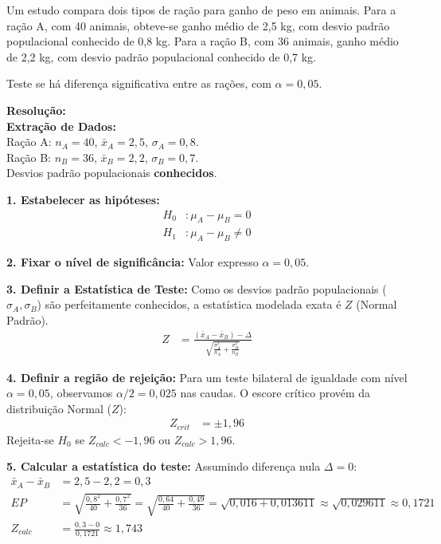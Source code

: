 \documentclass[12pt, a4paper]{article}
\begin{document}
Um estudo compara dois tipos de ração para ganho de peso em animais. Para a ração A, com 40 animais, obteve-se ganho médio de 2,5 kg, com desvio padrão populacional conhecido de 0,8 kg. Para a ração B, com 36 animais, ganho médio de 2,2 kg, com desvio padrão populacional conhecido de 0,7 kg. 

\medskip\noindent Teste se há diferença significativa entre as rações, com $\alpha = 0{,}05$.

\vspace{0.3cm}
\noindent\textbf{Resolução:}\\
\textbf{Extração de Dados:} \\
Ração A: $n_A = 40$, $\bar{x}_A = 2{,}5$, $\sigma_A = 0{,}8$. \\
Ração B: $n_B = 36$, $\bar{x}_B = 2{,}2$, $\sigma_B = 0{,}7$. \\
Desvios padrão populacionais \textbf{conhecidos}.

\medskip\noindent \textbf{1. Estabelecer as hipóteses:}
\begin{align*}
H_0 &: \mu_A - \mu_B = 0 \\
H_1 &: \mu_A - \mu_B \neq 0
\end{align*}

\noindent \textbf{2. Fixar o nível de significância:}
Valor expresso $\alpha = 0{,}05$.

\noindent \textbf{3. Definir a Estatística de Teste:}
Como os desvios padrão populacionais ($\sigma_A, \sigma_B$) são perfeitamente conhecidos, a estatística modelada exata é $Z$ (Normal Padrão).
\begin{align*}
Z &= \frac{(\bar{x}_A - \bar{x}_B) - \Delta}{\sqrt{\frac{\sigma_A^2}{n_A} + \frac{\sigma_B^2}{n_B}}}
\end{align*}

\noindent \textbf{4. Definir a região de rejeição:}
Para um teste bilateral de igualdade com nível $\alpha = 0{,}05$, observamos $\alpha/2 = 0{,}025$ nas caudas. O escore crítico provém da distribuição Normal ($Z$):
\begin{align*}
Z_{crit} &= \pm 1{,}96
\end{align*}
Rejeita-se $H_0$ se $Z_{calc} < -1{,}96$ ou $Z_{calc} > 1{,}96$.

\noindent \textbf{5. Calcular a estatística do teste:}
Assumindo diferença nula $\Delta = 0$:
\begin{align*}
\bar{x}_A - \bar{x}_B &= 2{,}5 - 2{,}2 = \boxed{0{,}3} \\
EP &= \sqrt{\frac{0{,}8^2}{40} + \frac{0{,}7^2}{36}} = \sqrt{\frac{0{,}64}{40} + \frac{0{,}49}{36}} = \sqrt{0{,}016 + 0{,}013611} \approx \sqrt{0{,}029611} \approx \boxed{0{,}1721} \\
Z_{calc} &= \frac{0{,}3 - 0}{0{,}1721} \approx \boxed{1{,}743}
\end{align*}
\end{document}
